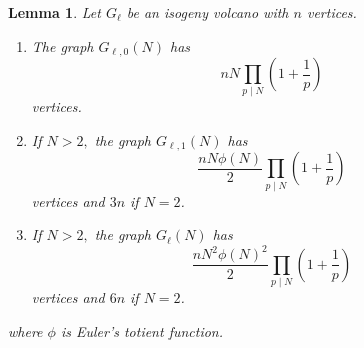 \documentclass[11pt,a4paper]{amsart}
\theoremstyle{plain}
\newtheorem{lem}[thm]{Lemma}
\theoremstyle{definition}
\theoremstyle{remark}
\begin{document}
\begin{lem}\label{lem:volcano-growth}
  Let $G_{\ell}$ be an isogeny volcano with $n$ vertices.
  \begin{enumerate}[label=(\roman*)]
  \item The graph $G_{\ell,0}(N)$ has
    \[
      n N\prod_{p \mid N}\left( 1 + \frac{1}{p} \right)
    \]
    vertices.
  \item If $N > 2,$ the graph $G_{\ell,1}(N)$ has
    \[
      \frac{nN\phi(N)}{2}\prod_{p \mid N}\left( 1 + \frac{1}{p} \right)
    \]
    vertices and $3n$ if $N = 2$.
  \item If $N > 2,$ the graph $G_{\ell}(N)$ has
    \[
      \frac{nN^2\phi(N)^2}{2} \prod_{p \mid N}\left( 1 + \frac{1}{p} \right)
    \]
    vertices and $6n$ if $N = 2$.
  \end{enumerate}
  where $\phi$ is Euler's totient function.
\end{lem}
\end{document}
